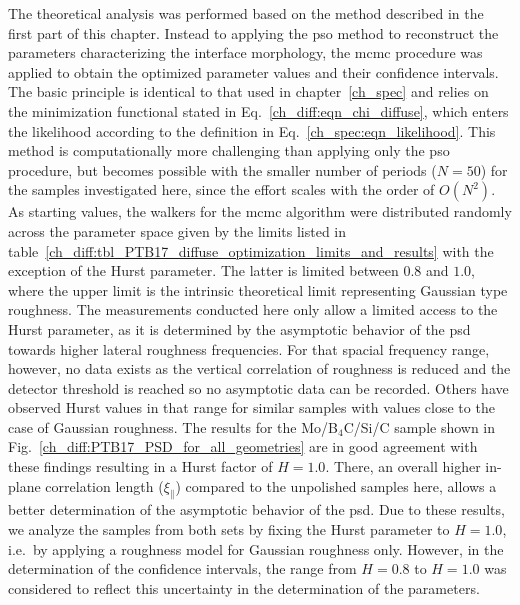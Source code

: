 The theoretical analysis was performed based on the method described in the first part of this chapter. Instead to applying the \gls{pso} method to reconstruct the parameters characterizing the interface morphology, the \gls{mcmc} procedure was applied to obtain the optimized parameter values and their confidence intervals. The basic principle is identical to that used in chapter~\ref{ch_spec} and relies on the minimization functional stated in Eq.~\eqref{ch_diff:eqn_chi_diffuse}, which enters the likelihood according to the definition in Eq.~\eqref{ch_spec:eqn_likelihood}. This method is computationally more challenging than applying only the \gls{pso} procedure, but becomes possible with the smaller number of periods ($N=50$) for the samples investigated here, since the effort scales with the order of $O(N^2)$. As starting values, the walkers for the \gls{mcmc} algorithm were distributed randomly across the parameter space given by the limits listed in table~\ref{ch_diff:tbl_PTB17_diffuse_optimization_limits_and_results} with the exception of the Hurst parameter. The latter is limited between $0.8$ and $1.0$, where the upper limit is the intrinsic theoretical limit representing Gaussian type roughness. The measurements conducted here only allow a limited access to the Hurst parameter, as it is determined by the asymptotic behavior of the \gls{psd} towards higher lateral roughness frequencies. For that spacial frequency range, however, no data exists as the vertical correlation of roughness is reduced and the detector threshold is reached so no asymptotic data can be recorded. Others \cite{rack_comparative_2010} have observed Hurst values in that range for similar samples with values close to the case of Gaussian roughness. The results for the Mo/B$_4$C/Si/C sample shown in Fig.~\ref{ch_diff:PTB17_PSD_for_all_geometries} are in good agreement with these findings resulting in a Hurst factor of $H=1.0$. There, an overall higher in-plane correlation length ($\xi_\parallel$) compared to the unpolished samples here, allows a better determination of the asymptotic behavior of the \gls{psd}. Due to these results, we analyze the samples from both sets by fixing the Hurst parameter to $H=1.0$, i.e.~by applying a roughness model for Gaussian roughness only. However, in the determination of the confidence intervals, the range from $H=0.8$ to $H=1.0$ was considered to reflect this uncertainty in the determination of the parameters. 

